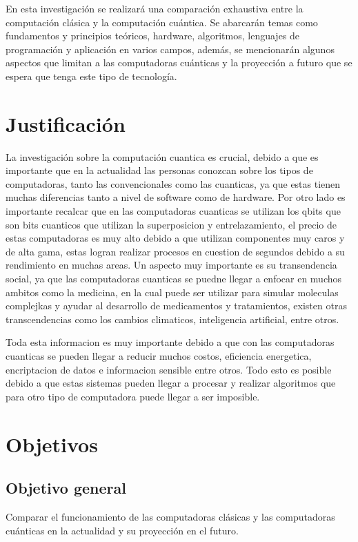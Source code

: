 \documentclass{article}
\begin{document}
En esta investigación se realizará una comparación exhaustiva entre la computación clásica y la computación cuántica. Se abarcarán temas como fundamentos y principios teóricos, hardware, algoritmos, lenguajes de programación y aplicación en varios campos, además, se mencionarán algunos aspectos que limitan a las computadoras cuánticas y la proyección a futuro que se espera que tenga este tipo de tecnología.

\newpage 
\section{Justificación}
La investigación sobre la computación cuantica es crucial, debido a que es importante que en la actualidad las personas conozcan sobre los tipos de computadoras, tanto las convencionales como las cuanticas, ya que estas tienen muchas diferencias tanto a nivel de software como de hardware. Por otro lado es importante recalcar que en las computadoras cuanticas se utilizan los qbits que son bits cuanticos que utilizan la superposicion y entrelazamiento, el precio de estas computadoras es muy alto debido a que utilizan componentes muy caros y de alta gama, estas logran realizar procesos en cuestion de segundos debido a su rendimiento en muchas areas. Un aspecto muy importante es su transendencia social, ya que las computadoras cuanticas se puedne llegar a enfocar en muchos ambitos como la medicina, en la cual puede ser utilizar para simular moleculas complejkas y ayudar al desarrollo de medicamentos y tratamientos, existen otras transcendencias como los cambios climaticos, inteligencia artificial, entre otros.

Toda esta informacion es muy importante debido a que con las computadoras cuanticas se pueden llegar a reducir muchos costos, eficiencia energetica, encriptacion de datos e informacion sensible entre otros. Todo esto es posible debido a que estas sistemas pueden llegar a procesar y realizar algoritmos que para otro tipo de computadora puede llegar a ser imposible.


\newpage
\section{Objetivos}

\subsection{Objetivo general}
Comparar el funcionamiento de las computadoras clásicas y las computadoras cuánticas en la actualidad y su proyección en el futuro.
\end{document}
